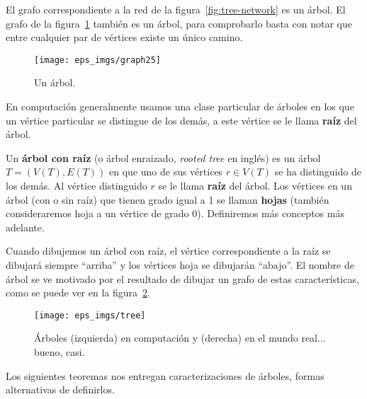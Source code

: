 \begin{ejemplo}
El grafo correspondiente a la red de la figura~\ref{fig:tree-network} es un árbol.
El grafo de la figura~\ref{fig:graph25} también es un árbol, para comprobarlo basta con notar que entre cualquier par de vértices existe un único camino.
\begin{figure}[h!]
\centering
\texttt{[image: eps\_imgs/graph25]}
\caption{Un árbol.}
\label{fig:graph25}
\end{figure}
\end{ejemplo}

En computación generalmente usamos una clase particular de árboles en los que un vértice particular se distingue de los demás, a este vértice se le llama {\bf raíz} del árbol.

\begin{definicion}
Un {\bf árbol con raíz} (o árbol enraizado, \emph{rooted tree} en inglés) es un árbol $T=(V(T),E(T))$ en que uno de sus vértices $r\in V(T)$ se ha distinguido de los demás. 
Al vértice distinguido $r$ se le llama {\bf raíz} del árbol.
Los vértices en un árbol (con o sin raíz) que tienen grado igual a 1 se llaman {\bf hojas}
(también consideraremos hoja a un vértice de grado 0).
Definiremos más conceptos más adelante.
\end{definicion}
Cuando dibujemos un árbol con raíz, el vértice correspondiente a la raíz se dibujará siempre ``arriba'' y los vértices hoja se dibujarán ``abajo''.
El nombre de árbol se ve motivado por el resultado de dibujar un grafo de estas características, como se puede ver en la figura~\ref{fig:tree}.
\begin{figure}[h!]
\centering
\texttt{[image: eps\_imgs/tree]}
\caption{Árboles (izquierda) en computación y (derecha) en el mundo real... bueno, casi.}
\label{fig:tree}
\end{figure}

Los siguientes teoremas nos entregan caracterizaciones de árboles, formas alternativas de definirlos.

